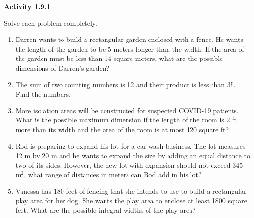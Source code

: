 \noindent\textbf{Activity 1.9.1}


Solve each problem completely.
\begin{enumerate}[label = \color{blue}\arabic*. ]
\item Darren wants to build a rectangular garden enclosed with a fence. He wants the length of the garden to be 5 meters longer than the width. If the area of the garden must be less than 14 square meters, what are the possible dimensions of Darren's garden?
\item The sum of two counting numbers is 12 and their product is less than 35. Find the numbers.
\item More isolation areas will be constructed for suspected COVID-19 patients. What is the possible maximum dimension if the length of the room is 2 ft more than its width and the area of the room is at most 120 square ft? 
\item Rod is preparing to expand his lot for a car wash business. The lot measures 12 m by 20 m and he wants to expand the size by adding an equal distance to two of its sides. However, the new lot with expansion should not exceed 345 m$^{2}$, what range of distances in meters can Rod add in his lot? 
\item Vanessa has 180 feet of fencing that she intends to use to build a rectangular play area for her dog. She wants the play area to enclose at least 1800 square feet. What are the possible integral widths of the play area?
\end{enumerate}
